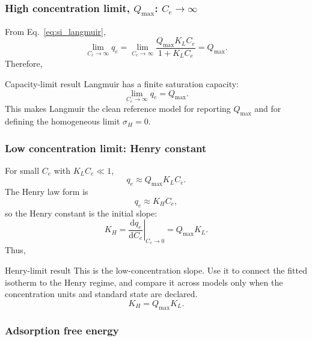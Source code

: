 \documentclass[journal=jacsat,manuscript=article]{achemso}
\begin{document}
\subsubsection{High concentration limit, \(Q_{\max}\): \(C_e \to \infty\)}

From Eq.~\eqref{eq:si_langmuir},
\begin{equation}
	\lim_{C_e \to \infty} q_e
	= \lim_{C_e \to \infty}
	\frac{Q_{\max} K_L C_e}{1 + K_L C_e}
	= Q_{\max}.
\end{equation}
Therefore,
\begin{greenbox}{Capacity-limit result}
	Langmuir has a finite saturation capacity:
	\begin{equation}
		\lim_{C_e \to \infty} q_e = Q_{\max}.
	\end{equation}
	This makes Langmuir the clean reference model for reporting \(Q_{\max}\)
	and for defining the homogeneous limit \(\sigma_H=0\).
\end{greenbox}

\subsubsection{Low concentration limit: Henry constant}

For small \(C_e\) with \(K_L C_e \ll 1\),
\begin{equation}
	q_e \approx Q_{\max} K_L C_e.
\end{equation}
The Henry law form is
\begin{equation}
	q_e \approx K_H C_e,
	\label{eq:si_henry}
\end{equation}
so the Henry constant is the initial slope:
\begin{equation}
	K_H = \left.\frac{\mathrm{d}q_e}{\mathrm{d}C_e}\right|_{C_e \to 0}
	= Q_{\max} K_L.
\end{equation}
Thus,
\begin{greenbox}{Henry-limit result}
	This is the low-concentration slope. Use it to connect the fitted isotherm to the Henry regime, and compare it across models only when the concentration units and standard state are declared.
\begin{equation}
	K_H = Q_{\max} K_L.
\end{equation}
\end{greenbox}



\subsubsection{Adsorption free energy}
\end{document}
